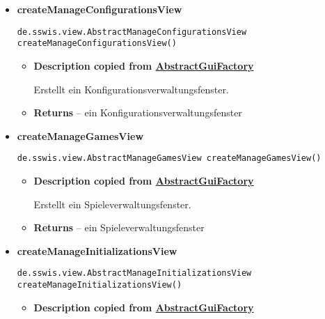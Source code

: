 {{{{{{{\begin{itemize}
{\begin{itemize}
{Erstellt ein Hauptfenster.
}
\item{{\bf  Returns} -- 
ein Hauptfenster 
}%
\end{itemize}
}%
\item{ 
\hypertarget{de.sswis.controller.SwingGuiFactory.createManageConfigurationsView()}{{\bf  createManageConfigurationsView}\\}
\begin{lstlisting}[frame=none]
de.sswis.view.AbstractManageConfigurationsView createManageConfigurationsView()\end{lstlisting} %
\begin{itemize}
\item{
{\bf  Description copied from \hyperlink{de.sswis.controller.AbstractGuiFactory}{AbstractGuiFactory}{\small {}} }

Erstellt ein Konfigurationsverwaltungsfenster.
}
\item{{\bf  Returns} -- 
ein Konfigurationsverwaltungsfenster 
}%
\end{itemize}
}%
\item{ 
\hypertarget{de.sswis.controller.SwingGuiFactory.createManageGamesView()}{{\bf  createManageGamesView}\\}
\begin{lstlisting}[frame=none]
de.sswis.view.AbstractManageGamesView createManageGamesView()\end{lstlisting} %
\begin{itemize}
\item{
{\bf  Description copied from \hyperlink{de.sswis.controller.AbstractGuiFactory}{AbstractGuiFactory}{\small {}} }

Erstellt ein Spieleverwaltungsfenster.
}
\item{{\bf  Returns} -- 
ein Spieleverwaltungsfenster 
}%
\end{itemize}
}%
\item{ 
\hypertarget{de.sswis.controller.SwingGuiFactory.createManageInitializationsView()}{{\bf  createManageInitializationsView}\\}
\begin{lstlisting}[frame=none]
de.sswis.view.AbstractManageInitializationsView createManageInitializationsView()\end{lstlisting} %
\begin{itemize}
\item{
{\bf  Description copied from \hyperlink{de.sswis.controller.AbstractGuiFactory}{AbstractGuiFactory}{\small {}} }

}
\end{itemize}}
\end{itemize}}}}}}}}
